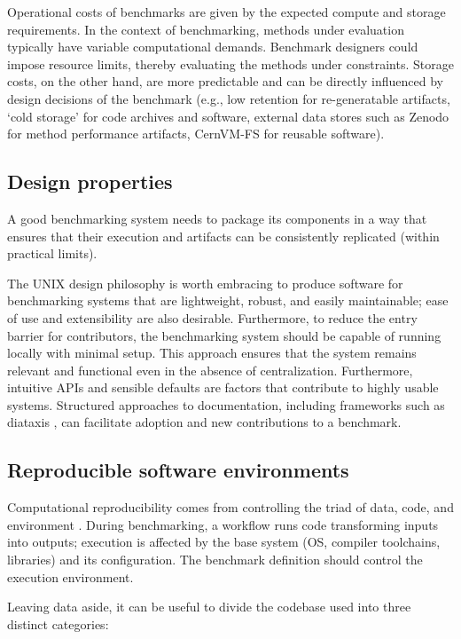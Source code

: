 \documentclass[11pt]{article}
\begin{document}
Operational costs of benchmarks are given by the expected compute and storage requirements. In the context of benchmarking, methods under evaluation typically have variable computational demands. Benchmark designers could impose resource limits, thereby evaluating the methods under constraints. Storage costs, on the other hand, are more predictable and can be directly influenced by design decisions of the benchmark (e.g., low retention for re-generatable artifacts, `cold storage' for code archives and software, external data stores such as Zenodo for method performance artifacts, CernVM-FS for reusable software).

\subsection*{Design properties}

A good benchmarking system needs to package its components in a way that ensures that their execution and artifacts can be consistently replicated (within practical limits).

The UNIX design philosophy \cite{Pike1984-we} is worth embracing to produce software for benchmarking systems that are lightweight, robust, and easily maintainable; ease of use and extensibility are also desirable. Furthermore, to reduce the entry barrier for contributors, the benchmarking system should be capable of running locally with minimal setup. This approach ensures that the system remains relevant and functional even in the absence of centralization. Furthermore, intuitive APIs and sensible defaults \cite{Proctor2018-do} are factors that contribute to highly usable systems. Structured approaches to documentation, including frameworks such as diataxis \cite{ProcidaUnknown-vf}, can facilitate adoption and new contributions to a benchmark.

\subsection*{Reproducible software environments}

Computational reproducibility comes from controlling the triad of data, code, and environment \cite{Hill2024-gf}. During benchmarking, a workflow runs code transforming inputs into outputs; execution is affected by the base system (OS, compiler toolchains, libraries) and its configuration. The benchmark definition should control the execution environment.

Leaving data aside, it can be useful to divide the codebase used into three distinct categories:
\end{document}
